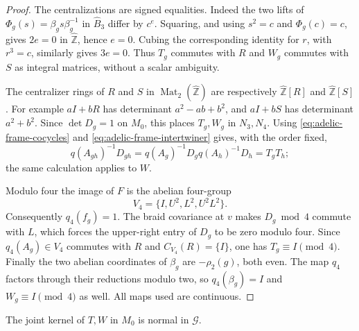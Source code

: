 \begin{proof}
The centralizations are signed equalities.  Indeed the two lifts of
$\Phi_g(s)=\beta_gs\beta_g^{-1}$ in $\widehat B_3$ differ by
$c^e$.  Squaring, and using $s^2=c$ and $\Phi_g(c)=c$, gives
$2e=0$ in $\widehat{\mathbb Z}$, hence $e=0$.  Cubing the
corresponding identity for $r$, with $r^3=c$, similarly gives
$3e=0$.  Thus $T_g$ commutes with $R$ and $W_g$ commutes with $S$
as integral matrices, without a scalar ambiguity.

The centralizer rings of $R$ and $S$ in
$\operatorname{Mat}_2(\widehat{\mathbb Z})$ are respectively
$\widehat{\mathbb Z}[R]$ and $\widehat{\mathbb Z}[S]$.
For example $aI+bR$ has determinant $a^2-ab+b^2$, and
$aI+bS$ has determinant $a^2+b^2$.  Since $\det D_g=1$ on
$M_0$, this places $T_g,W_g$ in $N_3,N_4$.
Using \eqref{eq:adelic-frame-cocycles} and
\eqref{eq:adelic-frame-intertwiner} gives, with the order fixed,
\[
 q(A_{gh})^{-1}D_{gh}
 =q(A_g)^{-1}D_gq(A_h)^{-1}D_h=T_gT_h;
\]
the same calculation applies to $W$.

Modulo four the image of $F$ is the abelian four-group
\[
 V_4=\{I,U^2,L^2,U^2L^2\}.
\]
Consequently $q_4(f_g)=1$.  The braid covariance at $v$ makes
$D_g\bmod4$ commute with $L$, which forces the upper-right entry
of $D_g$ to be zero modulo four.  Since $q_4(A_g)\in V_4$
commutes with $R$ and $C_{V_4}(R)=\{I\}$, one has
$T_g\equiv I\pmod4$.  Finally the two abelian coordinates of
$\beta_g$ are $-\rho_2(g)$, both even.  The map $q_4$ factors
through their reductions modulo two, so $q_4(\beta_g)=I$ and
$W_g\equiv I\pmod4$ as well.  All maps used are continuous.
\end{proof}

\begin{lemma}\label{lem:adelic-kernel-normality}
The joint kernel of $T,W$ in $M_0$ is normal in $\mathcal G$.
\end{lemma}

